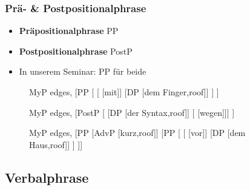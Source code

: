 \begin{frame}
\frametitle{Prä- \& Postpositionalphrase}

\begin{itemize}
	\item \textbf{Präpositionalphrase} \ras PP
	\item \textbf{Postpositionalphrase} \ras PostP
	\item In unserem Seminar: PP für beide
\end{itemize}

\begin{figure}[b]
  	\begin{minipage}[b]{0.30\textwidth}
	\centering
	\footnotesize{
		\begin{forest}
		MyP edges,
		[PP [
				[ [mit]]
				[DP [dem Finger,roof]]
			]
		]
		\end{forest}
		}
  	\end{minipage}  
  	\pause            
	\begin{minipage}[b]{0.30\textwidth}
	\centering
	\footnotesize{
		\begin{forest}
		MyP edges,
		[PostP [ [DP [der Syntax,roof]]
							[\zerobar{Post} [wegen]]]
		]	 
		\end{forest}
		}
  	\end{minipage}
 	\pause            
	\begin{minipage}[b]{0.30\textwidth}
	\centering
	\footnotesize{
		\begin{forest}
		MyP edges,
		[PP
		[AdvP [kurz,roof]]
		[PP [\MyPxbar{P}
				[\zerobar{P} [vor]]
				[DP [dem Haus,roof]]
			]
		]]
		\end{forest}
		}
  	\end{minipage}  
\end{figure}
\end{frame}


\subsection{Verbalphrase}

